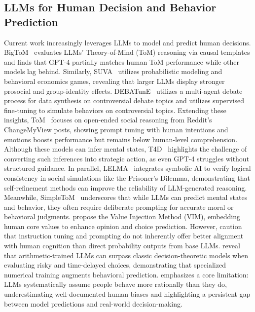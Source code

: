 \subsection{LLMs for Human Decision and Behavior Prediction}
\vspace{-0.2cm}
Current work increasingly leverages LLMs to model and predict human decisions. 
BigToM~\cite{gandhi2024understanding} evaluates LLMs’ Theory-of-Mind (ToM) reasoning via causal templates and finds that GPT-4 partially matches human ToM performance while other models lag behind. 
Similarly, SUVA~\cite{leng2023llm} utilizes probabilistic modeling and behavioral economics games, revealing that larger LLMs display stronger prosocial and group-identity effects. 
DEBATunE~\cite{li-etal-2024-llms-speak} utilizes a multi-agent debate process for data synthesis on controversial debate topics and utilizes supervised fine-tuning to simulate behaviors on controversial topics. 
Extending these insights, ToM~\cite{amirizaniani2024llms} focuses on open-ended social reasoning from Reddit’s ChangeMyView posts, showing prompt tuning with human intentions and emotions boosts performance but remains below human-level comprehension. 
Although these models can infer mental states, T4D~\cite{zhou2023far} highlights the challenge of converting such inferences into strategic action, as even GPT-4 struggles without structured guidance. 
In parallel, LELMA~\cite{mensfelt2024logic} integrates symbolic AI to verify logical consistency in social simulations like the Prisoner’s Dilemma, demonstrating that self-refinement methods can improve the reliability of LLM-generated reasoning. 
Meanwhile, SimpleToM~\cite{gu2024simpletom} underscores that while LLMs can predict mental states and behavior, they often require deliberate prompting for accurate moral or behavioral judgments. \citet{kang-etal-2023-values} propose the Value Injection Method (VIM), embedding human core values to enhance opinion and choice prediction. 
However, \citet{kuribayashi-etal-2024-psychometric} caution that instruction tuning and prompting do not inherently offer better alignment with human cognition than direct probability outputs from base LLMs. %
\citet{zhu2024language} reveal that arithmetic-trained LLMs can surpass classic decision-theoretic models when evaluating risky and time-delayed choices, demonstrating that specialized numerical training augments behavioral prediction. 
\citet{liu2024large} emphasizes a core limitation: LLMs systematically assume people behave more rationally than they do, underestimating well-documented human biases and highlighting a persistent gap between model predictions and real-world decision-making.

 

\vspace{-0.2cm}